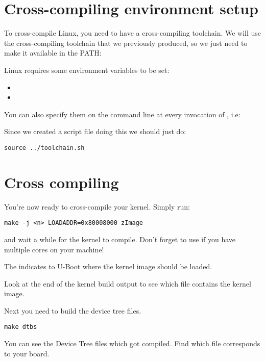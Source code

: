 \section{Cross-compiling environment setup}

To cross-compile Linux, you need to have a cross-compiling
toolchain. We will use the cross-compiling toolchain that we
previously produced, so we just need to make it available in the PATH:

Linux requires some environment variables to be set:

\begin{itemize}
\item {}
\item {}
\end{itemize}

You can also specify them on the command line at every invocation of
, i.e: 


Since we created a script file doing this we should just do:

\begin{verbatim}
source ../toolchain.sh
\end{verbatim}

\clearpage
\section{Cross compiling}

You're now ready to cross-compile your kernel. Simply run:

\begin{verbatim}
make -j <n> LOADADDR=0x80008000 zImage
\end{verbatim}

and wait a while for the kernel to compile. Don't forget to use
 if you have multiple cores on your machine!

The  indicates to U-Boot where the kernel image should
be loaded.

Look at the end of the kernel build output to see which file contains
the kernel image. 

Next you need to build the device tree files.

\begin{verbatim}
make dtbs
\end{verbatim}

You can see the Device Tree  files which got compiled. 
Find which  file corresponds to your board.


